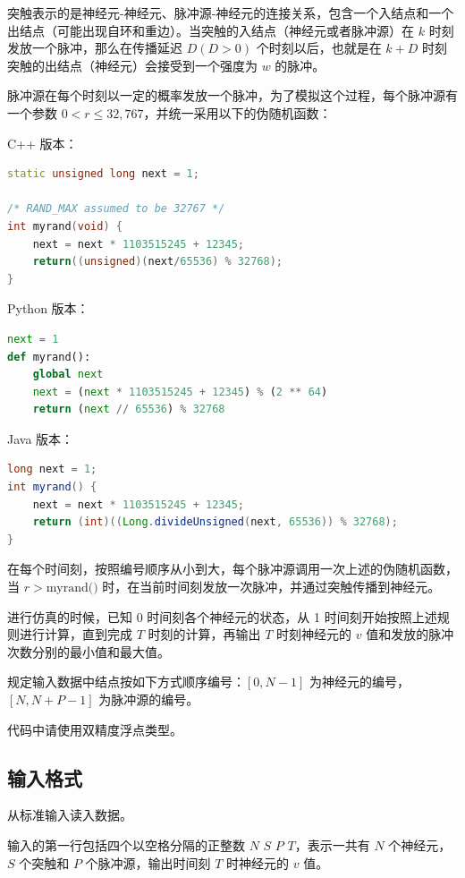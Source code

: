 突触表示的是神经元-神经元、脉冲源-神经元的连接关系，包含一个入结点和一个出结点（可能出现自环和重边）。当突触的入结点（神经元或者脉冲源）在 $k$ 时刻发放一个脉冲，那么在传播延迟 $D(D > 0)$ 个时刻以后，也就是在 $k+D$ 时刻突触的出结点（神经元）会接受到一个强度为 $w$ 的脉冲。

脉冲源在每个时刻以一定的概率发放一个脉冲，为了模拟这个过程，每个脉冲源有一个参数 $0 < r \le 32,767$，并统一采用以下的伪随机函数：

C++ 版本：

\begin{lstlisting}[language=c++]
static unsigned long next = 1;

/* RAND_MAX assumed to be 32767 */
int myrand(void) {
    next = next * 1103515245 + 12345;
    return((unsigned)(next/65536) % 32768);
}
\end{lstlisting}

Python 版本：

\begin{lstlisting}[language=python]
next = 1
def myrand():
    global next
    next = (next * 1103515245 + 12345) % (2 ** 64)
    return (next // 65536) % 32768
\end{lstlisting}

Java 版本：

\begin{lstlisting}[language=java]
long next = 1;
int myrand() {
    next = next * 1103515245 + 12345;
    return (int)((Long.divideUnsigned(next, 65536)) % 32768);
}
\end{lstlisting}

在每个时间刻，按照编号顺序从小到大，每个脉冲源调用一次上述的伪随机函数，当 $r > \text{myrand()}$ 时，在当前时间刻发放一次脉冲，并通过突触传播到神经元。

进行仿真的时候，已知 0 时间刻各个神经元的状态，从 1 时间刻开始按照上述规则进行计算，直到完成 $T$ 时刻的计算，再输出 $T$ 时刻神经元的 $v$ 值和发放的脉冲次数分别的最小值和最大值。

规定输入数据中结点按如下方式顺序编号：$[0, N-1]$ 为神经元的编号，$[N, N+P-1]$ 为脉冲源的编号。

代码中请使用双精度浮点类型。

\subsection*{输入格式}

从标准输入读入数据。

输入的第一行包括四个以空格分隔的正整数 $N$ $S$ $P$ $T$，表示一共有 $N$ 个神经元，$S$ 个突触和 $P$ 个脉冲源，输出时间刻 $T$ 时神经元的 $v$ 值。

